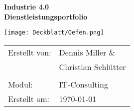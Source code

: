 \thispagestyle{plain}
\begin{titlepage}

\vspace*{\fill}

\begin{center}

\Huge{\textbf{Industrie 4.0}}\\[1.5ex]
\Large{\textbf{Dienstleistungsportfolio}}

\vspace{1.5cm}

\texttt{[image: Deckblatt/Oefen.png]}

\vspace{1.5cm}


\normalsize
\begin{tabular}{ll}\\
	Erstellt von: 
	& \quad Dennis Miller \& \\[1.2ex]
	& \quad Christian Schlütter\\[1.2ex]
	& \quad \\[1.2ex]
	Modul:  & \quad IT-Consulting \\[1.2ex]
	Erstellt am:  & \quad \today\\[1.2ex]
\end{tabular}

\end{center}
\vspace*{\fill}

\end{titlepage}
